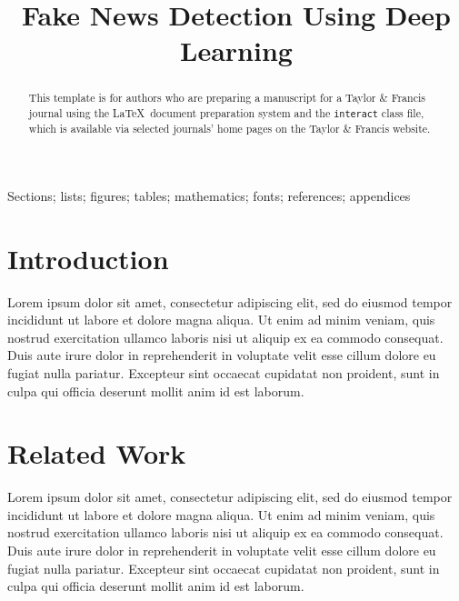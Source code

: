 \documentclass[]{interact}
\theoremstyle{plain}%
\theoremstyle{definition}
\theoremstyle{remark}
\begin{document}

\title{Fake News Detection Using Deep Learning}

\author{
}

\maketitle

\begin{abstract}
This template is for authors who are preparing a manuscript for a Taylor \& Francis journal using the \LaTeX\ document preparation system and the \texttt{interact} class file, which is available via selected journals' home pages on the Taylor \& Francis website.
\end{abstract}

\begin{keywords}
Sections; lists; figures; tables; mathematics; fonts; references; appendices
\end{keywords}

\section{Introduction}

Lorem ipsum dolor sit amet, consectetur adipiscing elit, sed do eiusmod tempor incididunt ut labore et dolore magna aliqua. Ut enim ad minim veniam, quis nostrud exercitation ullamco laboris nisi ut aliquip ex ea commodo consequat. Duis aute irure dolor in reprehenderit in voluptate velit esse cillum dolore eu fugiat nulla pariatur. Excepteur sint occaecat cupidatat non proident, sunt in culpa qui officia deserunt mollit anim id est laborum.

\section{Related Work}

Lorem ipsum dolor sit amet, consectetur adipiscing elit, sed do eiusmod tempor incididunt ut labore et dolore magna aliqua. Ut enim ad minim veniam, quis nostrud exercitation ullamco laboris nisi ut aliquip ex ea commodo consequat. Duis aute irure dolor in reprehenderit in voluptate velit esse cillum dolore eu fugiat nulla pariatur. Excepteur sint occaecat cupidatat non proident, sunt in culpa qui officia deserunt mollit anim id est laborum.
\end{document}
